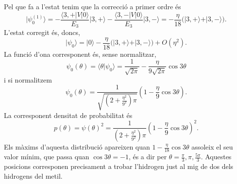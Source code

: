 \documentclass[12pt]{article}
\numberwithin{table}{section}
\numberwithin{figure}{section}
\newcommand{\ket}[1]{\vert {#1} \rangle}
\newcommand{\bra}[1]{\langle #1 \vert}
\newcommand{\braket}[2]{\langle {#1} \vert {#2} \rangle}
\begin{document}
Pel que fa a l'estat tenim que la correcció a primer ordre és
\begin{equation*}
	\ket{\psi_0^{(1)}} = -\frac{\bra{3,+}V\ket{0}}{E_3}\ket{3,+} -\frac{\bra{3,-}V\ket{0}}{E_3}\ket{3,-} = -\frac{\eta}{18}\big( \ket{3,+} + \ket{3,-} \big).
\end{equation*}
L'estat corregit és, doncs,
\begin{equation*}
	\ket{\psi_0} = \ket{0} -\frac{\eta}{18}\big( \ket{3,+} + \ket{3,-} \big) + O(\eta^2).
\end{equation*}
La funció d'ona corresponent és, sense normalitzar,
\begin{equation*}
	\psi_0(\theta) = \braket{\theta}{\psi_0} = \frac{1}{\sqrt{2\pi}} - \frac{\eta}{9\sqrt{2\pi}}\cos{3\theta}
\end{equation*}
i si normalitzem
\begin{equation*}
	\psi_0(\theta) = \frac{1}{\sqrt{\left(2 + \frac{\eta^2}{9^2}\right)\pi}}\left(1 - \frac{\eta}{9}\cos{3\theta}\right).
\end{equation*}
La corresponent densitat de probabilitat és
\begin{equation*}
	p(\theta) = \psi(\theta)^2 = \frac{1}{\left(2 + \frac{\eta^2}{9^2}\right)\pi}\left(1 - \frac{\eta}{9}\cos{3\theta}\right)^2.
\end{equation*}
Els màxims d'aquesta distribució apareixen quan \( 1 - \frac{\eta}{18}\cos{3\theta} \) assoleix el seu valor mínim, que passa quan \( \cos{3\theta} = -1 \), és a dir per \( \theta = \frac{\pi}{3}, \pi, \frac{5\pi}{3} \). Aquestes posicions corresponen precisament a trobar l'hidrogen just al mig de dos dels hidrogens del metil.
\end{document}

